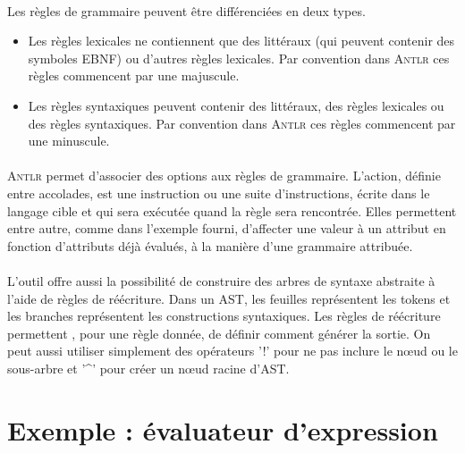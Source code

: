 \documentclass[paper=a4, fontsize=11pt]{scrartcl} %
\numberwithin{equation}{section} %
\numberwithin{figure}{section} %
\numberwithin{table}{section} %
\begin{document}
\paragraph{}Les règles de grammaire peuvent être différenciées en deux types.
\begin{itemize}
 \item Les règles lexicales ne contiennent que des littéraux (qui peuvent 
 contenir des symboles EBNF) ou d'autres règles lexicales. Par convention dans 
 \textsc{Antlr} ces règles commencent par une majuscule.
 \item Les règles syntaxiques peuvent contenir des littéraux, des règles 
 lexicales ou des règles syntaxiques. Par convention dans \textsc{Antlr} ces 
 règles commencent par une minuscule.
\end{itemize}

\paragraph{}\textsc{Antlr} permet d'associer des options aux règles de grammaire. L'action, définie entre accolades, est une instruction ou une suite d'instructions, écrite dans le langage cible et qui sera exécutée quand la règle sera rencontrée. Elles permettent entre autre, comme dans l'exemple fourni, d'affecter une valeur à un attribut en fonction d'attributs déjà évalués, à la manière d'une grammaire attribuée.

\paragraph{}L'outil offre aussi la possibilité de construire des arbres de 
syntaxe abstraite à l'aide de règles de réécriture. Dans un AST, les feuilles 
représentent les tokens et les branches représentent les constructions 
syntaxiques. Les règles de réécriture permettent , pour une règle donnée, de 
définir comment générer la sortie. On peut aussi utiliser simplement des 
opérateurs '!' pour ne pas inclure le nœud ou le sous-arbre et '\textbf{\^}' 
pour créer un nœud racine d'AST. %


\section{Exemple : évaluateur d'expression}
\end{document}

